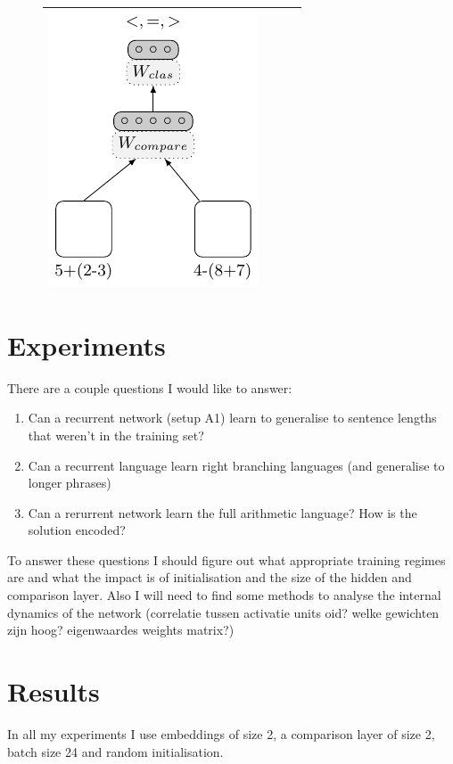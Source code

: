 \documentclass{article}
\begin{document}
\begin{figure}[!ht]
\begin{tabular}{|cccc|}
    \includegraphics[scale=0.9]{A4}\\
\hline
\end{tabular}
\end{figure}


\section{Experiments}

There are a couple questions I would like to answer:\begin{enumerate}
\item Can a recurrent network (setup A1) learn to generalise to sentence lengths that weren't in the training set?
\item Can a recurrent language learn right branching languages (and generalise to longer phrases)
\item Can a rerurrent network learn the full arithmetic language? How is the solution encoded?
\end{enumerate}

To answer these questions I should figure out what appropriate training regimes are and what the impact is of initialisation and the size of the hidden and comparison layer. Also I will need to find some methods to analyse the internal dynamics of the network (correlatie tussen activatie units oid? welke gewichten zijn hoog? eigenwaardes weights matrix?)

\section{Results}

In all my experiments I use embeddings of size 2, a comparison layer of size 2, batch size 24 and random initialisation.
\end{document}
